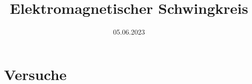 
\usepackage{subfiles}

\title{Elektromagnetischer Schwingkreis}
\date{05.06.2023}


\maketitle


\newpage

\newpage
\part{Versuche}


\newpage

